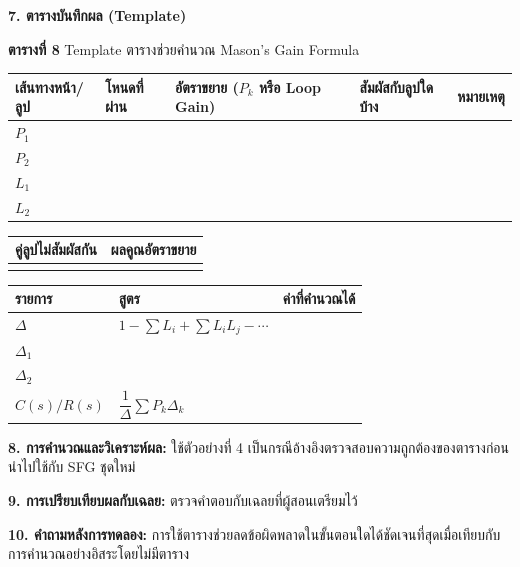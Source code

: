 \textbf{7. ตารางบันทึกผล (Template)}

\textbf{ตารางที่ 8} Template ตารางช่วยคำนวณ Mason's Gain Formula

\begin{table}[htbp]
    \centering
    \begin{tabular}{l l l l l}
        \hline
        \textbf{เส้นทางหน้า/ลูป} & \textbf{โหนดที่ผ่าน} & \textbf{อัตราขยาย ($P_k$ หรือ Loop Gain)} & \textbf{สัมผัสกับลูปใดบ้าง} & \textbf{หมายเหตุ} \\
        \hline
        $P_1$ &  &  &  &  \\
        $P_2$ &  &  &  &  \\
        $L_1$ &  &  &  &  \\
        $L_2$ &  &  &  &  \\
        \hline
    \end{tabular}
\end{table}

\begin{table}[htbp]
    \centering
    \begin{tabular}{l l}
        \hline
        \textbf{คู่ลูปไม่สัมผัสกัน} & \textbf{ผลคูณอัตราขยาย} \\
        \hline
         &  \\
        \hline
    \end{tabular}
\end{table}

\begin{table}[htbp]
    \centering
    \begin{tabular}{l l l}
        \hline
        \textbf{รายการ} & \textbf{สูตร} & \textbf{ค่าที่คำนวณได้} \\
        \hline
        $\Delta$ & $1-\sum L_i+\sum L_iL_j-\cdots$ &  \\
        $\Delta_1$ &  &  \\
        $\Delta_2$ &  &  \\
        $C(s)/R(s)$ & $\dfrac{1}{\Delta}\sum P_k\Delta_k$ &  \\
        \hline
    \end{tabular}
\end{table}

\textbf{8. การคำนวณและวิเคราะห์ผล:} ใช้ตัวอย่างที่ 4 เป็นกรณีอ้างอิงตรวจสอบความถูกต้องของตารางก่อนนำไปใช้กับ SFG ชุดใหม่

\textbf{9. การเปรียบเทียบผลกับเฉลย:} ตรวจคำตอบกับเฉลยที่ผู้สอนเตรียมไว้

\textbf{10. คำถามหลังการทดลอง:} การใช้ตารางช่วยลดข้อผิดพลาดในขั้นตอนใดได้ชัดเจนที่สุดเมื่อเทียบกับการคำนวณอย่างอิสระโดยไม่มีตาราง

